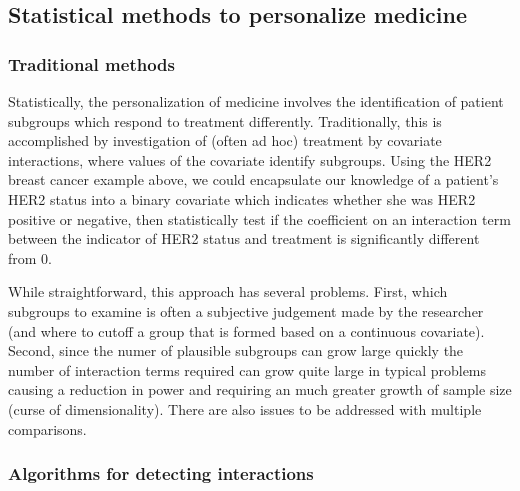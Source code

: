 \documentclass[12pt]{article}
\begin{document}
\subsection{Statistical methods to personalize medicine} %
\label{sub:statistical_methods_to_personalize_medicine}


\subsubsection{Traditional methods} %
\label{ssub:traditional_methods}


Statistically, the personalization of medicine involves the identification of patient subgroups which respond to treatment differently. Traditionally, this is accomplished by investigation of (often ad hoc) treatment by covariate interactions, where values of the covariate identify subgroups. Using the HER2 breast cancer example above, we could encapsulate our knowledge of a patient's HER2 status into a binary covariate which indicates whether she was HER2 positive or negative, then statistically test if the coefficient on an interaction term between the indicator of HER2 status and treatment is significantly different from 0.


While straightforward, this approach has several problems. First, which subgroups to examine is often a subjective judgement made by the researcher (and where to cutoff a group that is formed based on a continuous covariate). Second, since the numer of plausible subgroups can grow large quickly the number of interaction terms required can grow quite large in typical problems causing a reduction in power and requiring an much greater growth of sample size (curse of dimensionality). There are also issues to be addressed with multiple comparisons.

\subsubsection{Algorithms for detecting interactions} %
\label{ssub:algorithms_for_detecting_interactions}
\end{document}

